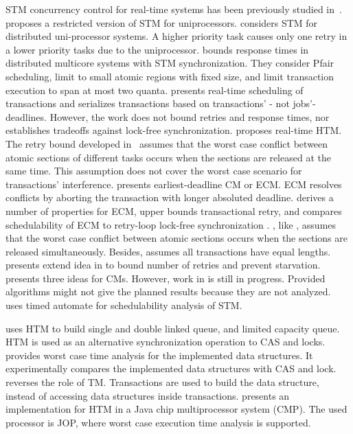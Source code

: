 \documentclass[12pt,english]{report}
\begin{document}
STM concurrency control for real-time systems has been
previously studied in~\cite{manson2006preemptible,fahmy2009bounding,sarni2009real,schoeberl2010rttm,barrosmanaging,6045438,fahmy2009response}.
\cite{manson2006preemptible} proposes a restricted version of STM
for uniprocessors. \cite{fahmy2009response} considers STM for distributed
uni-processor systems. A higher priority task causes only one retry
in a lower priority tasks due to the uniprocessor. \cite{fahmy2009bounding}
bounds response times in distributed multicore systems with STM
synchronization. They consider Pfair scheduling, limit to small atomic
regions with fixed size, and limit transaction execution to span at
most two quanta. \cite{sarni2009real} presents real-time scheduling
of transactions and serializes transactions based on transactions'
- not jobs'- deadlines. However, the work does not bound retries and
response times, nor establishes tradeoffs against lock-free synchronization.
\cite{schoeberl2010rttm} proposes real-time HTM. The retry bound
developed in~\cite{schoeberl2010rttm} assumes that the worst case
conflict between atomic sections of different tasks occurs when the
sections are released at the same time. This assumption does not cover
the worst case scenario for transactions' interference. \cite{6045438}
presents earliest-deadline CM or ECM. ECM resolves conflicts by aborting
the transaction with longer absoluted deadline. \cite{6045438} derives
a number of properties for ECM, upper bounds transactional retry,
and compares schedulability of ECM to retry-loop lock-free synchronization
\cite{key-5}. \cite{6045438}, like \cite{schoeberl2010rttm}, assumes
that the worst case conflict between atomic sections occurs when the
sections are released simultaneously. Besides, \cite{6045438} assumes
all transactions have equal lengths. \cite{barrosmanaging} presents
extend idea in \cite{6045438} to bound number of retries and prevent
starvation. \cite{barrosmanaging} presents three ideas for CMs. However,
work in \cite{barrosmanaging} is still in progress. Provided algorithms
might not give the planned results because they are not analyzed.~\cite{6120942} uses timed automate for schedulability analysis of STM.

\cite{Meawad:2011:RWQ:2043910.2043912} uses HTM to build single and
double linked queue, and limited capacity queue. HTM is used as an
alternative synchronization operation to CAS and locks. \cite{Meawad:2011:RWQ:2043910.2043912}
provides worst case time analysis for the implemented data structures.
It experimentally compares the implemented data structures with CAS
and lock. \cite{Meawad:2011:RWQ:2043910.2043912} reverses the role
of TM. Transactions are used to build the data structure, instead of
accessing data structures inside transactions. \cite{5694263} presents
an implementation for HTM in a Java chip multiprocessor system (CMP).
The used processor is JOP, where worst case execution time analysis
is supported.
\end{document}
